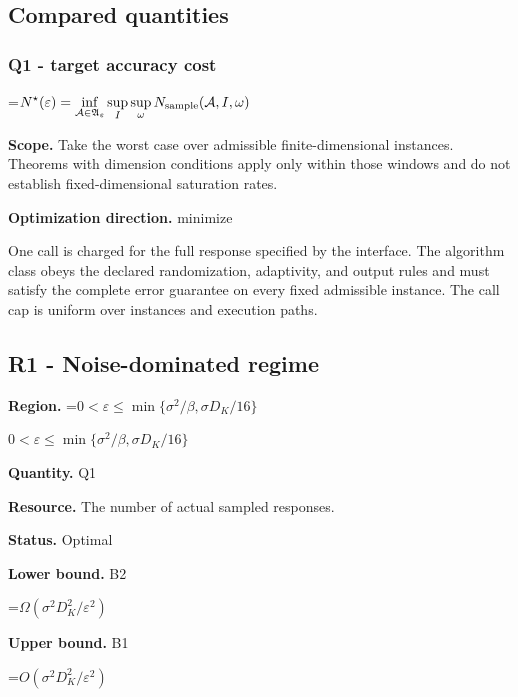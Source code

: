 \documentclass[10pt,a4paper]{article}
\newcommand{\AtlasMath}[1]{\par\begingroup\centering\setbox0=\hbox{$\displaystyle #1$}\ifdim\wd0>1.4\linewidth\typeout{ATLAS WIDE FORMULA: \the\wd0}\fi\ifdim\wd0>\linewidth\resizebox{\linewidth}{!}{\box0}\else\box0\fi\par\endgroup}
\newcommand{\AtlasInlineMath}[1]{\begingroup\setbox0=\hbox{$#1$}\ifdim\wd0>.4\linewidth\endgroup\AtlasMath{#1}\else\endgroup$#1$\fi}
\begin{document}
\subsection{Compared quantities}


\subsubsection{Q1 - target accuracy cost}


\AtlasMath{N^\star(\varepsilon)=\inf_{\mathcal A\in\mathfrak A_\varepsilon}\sup_I \sup_\omega N_{\rm sample}(\mathcal A,I,\omega)}


\textbf{Scope.} Take the worst case over admissible finite-dimensional instances. Theorems with dimension conditions apply only within those windows and do not establish fixed-dimensional saturation rates.



\textbf{Optimization direction.} minimize



One call is charged for the full response specified by the interface. The algorithm class obeys the declared randomization, adaptivity, and output rules and must satisfy the complete error guarantee on every fixed admissible instance. The call cap is uniform over instances and execution paths.



\subsection{R1 - Noise-dominated regime}


\textbf{Region.} \AtlasInlineMath{0<\varepsilon\le\min\{\sigma^2/\beta,\sigma D_K/16\}}



\textbf{Quantity.} Q1



\textbf{Resource.} The number of actual sampled responses.



\textbf{Status.} Optimal



\textbf{Lower bound.} B2



\AtlasMath{\Omega(\sigma^2D_K^2/\varepsilon^2)}


\textbf{Upper bound.} B1



\AtlasMath{O(\sigma^2D_K^2/\varepsilon^2)}
\end{document}
